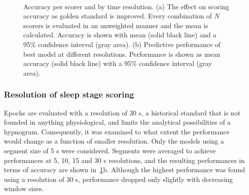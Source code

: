 \begin{figure}[tb]
    \myfloatalign   
      ~
    \caption[Accuracy per scorer and by time resolution]{Accuracy per scorer and by time resolution. (a) The effect on scoring accuracy as golden standard is improved. Every combination of $N$ scorers is evaluated in an unweighted manner and the mean is calculated. Accuracy is shown with mean (solid black line) and a 95\% confidence interval (gray area). (b) Predictive performance of best model at different resolutions. Performance is shown as mean accuracy (solid black line) with a 95\% confidence interval
(gray area).}
    \label{fig:paperiii-figure01}
\end{figure}
\subsubsection{Resolution of sleep stage scoring}
Epochs are evaluated with a resolution of 30 s, a historical standard that is not founded in anything physiological, and limits the analytical possibilities of a hypnogram.
Consequently, it was examined to what extent the performance would change as a function of smaller resolution.
Only the models using a segment size of 5 s were considered.
Segments were averaged to achieve performances at 5, 10, 15 and 30 s resolutions, and the resulting performances in terms of accuracy are shown in~\cref{fig:paperiii-figure01}b. 
Although the highest performance was found using a resolution of 30 s, performance dropped only slightly with decreasing window sizes.

